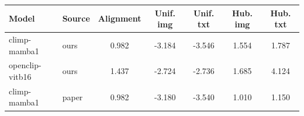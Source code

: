 \begin{tabular}{llccccc}
\toprule
Model & Source & Alignment & Unif. img & Unif. txt & Hub. img & Hub. txt \\
\midrule
climp-mamba1 & ours & 0.982 & -3.184 & -3.546 & 1.554 & 1.787 \\
openclip-vitb16 & ours & 1.437 & -2.724 & -2.736 & 1.685 & 4.124 \\
climp-mamba1 & paper & 0.982 & -3.180 & -3.540 & 1.010 & 1.150 \\
\bottomrule
\end{tabular}

